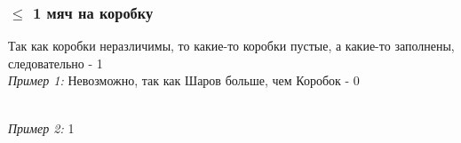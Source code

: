 \documentclass{article}
\begin{document}
            \subsubsection{$\le$ 1 мяч на коробку}
                Так как коробки неразличимы, то какие-то коробки пустые, а какие-то заполнены, следовательно - 1\\
                \textit{Пример 1:} Невозможно, так как Шаров больше, чем Коробок - 0
                \begin{figure}[h!]
                \end{figure}\\
                \textit{Пример 2:} 1
                \begin{figure}[h!]
                \end{figure}
\end{document}
